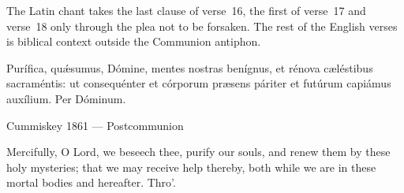 The Latin chant takes the last clause of verse~16, the first of verse~17 and verse~18 only through the plea not to be forsaken. The rest of the English verses is biblical context outside the Communion antiphon.



Purífica, quǽsumus, Dómine, mentes nostras benígnus, et rénova cæléstibus
sacraméntis: ut consequénter et córporum præsens páriter et futúrum
capiámus auxílium. Per Dóminum.

\finishfulltextelement

\begin{fulltextenglish}{Cummiskey 1861 --- Postcommunion}

Mercifully, O Lord, we beseech thee, purify our souls, and renew them by these holy mysteries; that we may receive help thereby, both while we are in these mortal bodies and hereafter. Thro’.

\end{fulltextenglish}
